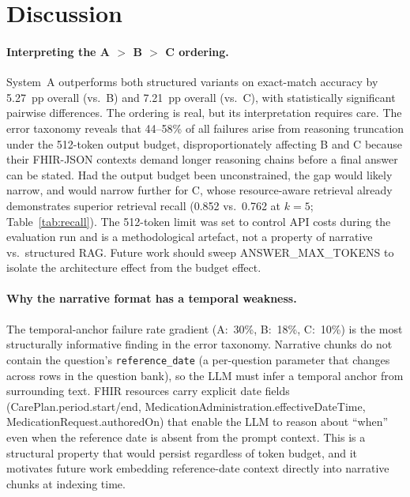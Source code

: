 
\section{Discussion}
\label{sec:discussion}

\paragraph{Interpreting the A $>$ B $>$ C ordering.}
System~A outperforms both structured variants on exact-match accuracy by 5.27~pp overall
(vs.\ B) and 7.21~pp overall (vs.\ C), with statistically significant pairwise differences.  The ordering
is real, but its interpretation requires care.  The error taxonomy reveals that
44--58\% of all failures arise from reasoning truncation under the 512-token output
budget, disproportionately affecting B and C because their FHIR-JSON contexts demand
longer reasoning chains before a final answer can be stated.  Had the output budget
been unconstrained, the gap would likely narrow, and would narrow further for C,
whose resource-aware retrieval already demonstrates superior retrieval recall
(0.852 vs.\ 0.762 at $k=5$; Table~\ref{tab:recall}).
The 512-token limit was set to control API costs during the evaluation run and
is a methodological artefact, not a property of narrative vs.\ structured RAG.
Future work should sweep ANSWER\_MAX\_TOKENS to isolate the architecture effect from
the budget effect.

\paragraph{Why the narrative format has a temporal weakness.}
The temporal-anchor failure rate gradient (A:~30\%, B:~18\%, C:~10\%) is the most
structurally informative finding in the error taxonomy.  Narrative chunks do not
contain the question's \texttt{reference\_date} (a per-question parameter that changes
across rows in the question bank), so the LLM must infer a temporal anchor from
surrounding text.  FHIR resources carry explicit date fields
(CarePlan.period.start/end, MedicationAdministration.effectiveDateTime,
MedicationRequest.authoredOn) that enable the LLM to reason about ``when'' even when
the reference date is absent from the prompt context.  This is a structural property
that would persist regardless of token budget, and it motivates future work embedding
reference-date context directly into narrative chunks at indexing time.

